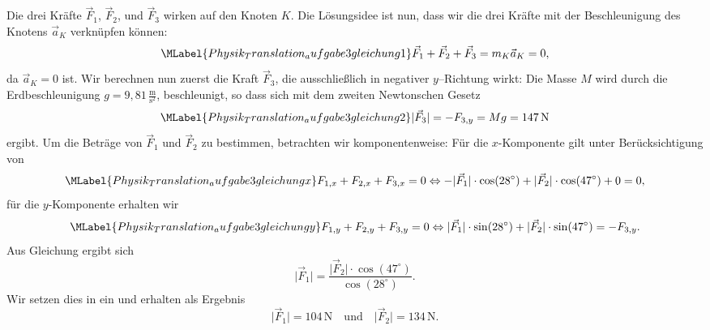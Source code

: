 \begin{MExercises}
\begin{MExercise}
               
               
               \begin{MSolution}
               Die drei Kr\"afte $\vec{F}_1$, $\vec{F}_2$, und $\vec{F}_3$ wirken auf den Knoten $K$. Die L\"osungsidee ist nun, dass wir die drei Kr\"afte mit der Beschleunigung des Knotens $\vec{a}_K$ verkn\"upfen k\"onnen: 
               \begin{equation}\MLabel{Physik_Translation_aufgabe3gleichung1}
               \vec{F}_1+\vec{F}_2+\vec{F}_3=m_K\vec{a}_K=0,
               \end{equation} da $\vec{a}_K=0$ ist. Wir berechnen nun zuerst die Kraft $\vec{F}_3$, die ausschlie{\ss}lich in negativer $y$--Richtung wirkt: Die Masse $M$ wird durch die Erdbeschleunigung $g={9,81}\, \frac{\text{m}}{\text{s}^2}$, beschleunigt, so dass sich mit dem zweiten Newtonschen Gesetz 
               \begin{equation}\MLabel{Physik_Translation_aufgabe3gleichung2}
               \vert \vec{F}_3\vert=-F_{3,y}=Mg=147\,\text{N}
               \end{equation} ergibt. Um die Betr\"age von $\vec{F}_1$ und $\vec{F}_2$ zu bestimmen, betrachten wir  komponentenweise: F\"ur die $x$-Komponente gilt unter Ber\"ucksichtigung von 
               \begin{equation}\MLabel{Physik_Translation_aufgabe3gleichungx}
               F_{1,x}+F_{2,x}+F_{3,x}=0\Leftrightarrow -\vert \vec{F}_1\vert\cdot\cos(28^{\circ})+\vert \vec{F}_2\vert\cdot\cos(47^{\circ})+0=0,
               \end{equation}f\"ur die $y$-Komponente erhalten wir
               \begin{equation}\MLabel{Physik_Translation_aufgabe3gleichungy}
               F_{1,y}+F_{2,y}+F_{3,y}=0\Leftrightarrow \vert \vec{F}_1\vert\cdot\sin(28^{\circ})+\vert \vec{F}_2\vert\cdot\sin(47^{\circ})=-F_{3,y}.
               \end{equation} Aus Gleichung  ergibt sich
               $$
               \vert \vec{F}_1\vert=\frac{\vert \vec{F}_2\vert\cdot\cos(47^{\circ})}{\cos(28^{\circ})}.
               $$Wir setzen dies in  ein und erhalten als Ergebnis
               $$
               \vert \vec{F}_1\vert= 104\,\text{N}\quad\text{und}\quad \vert \vec{F}_2\vert= 134\,\text{N.} 
               $$
               


\end{MSolution}
\end{MExercise}
\end{MExercises}
